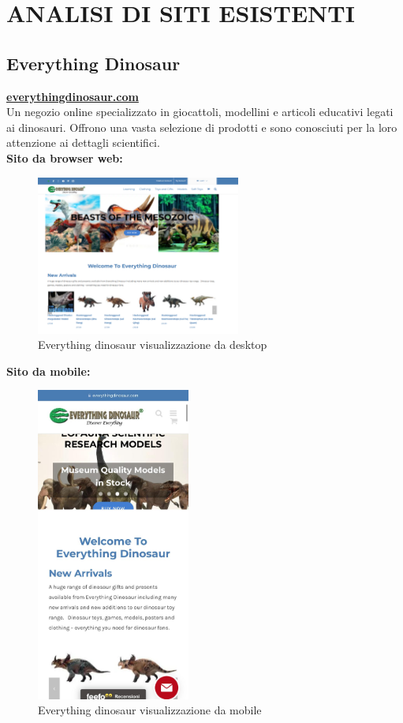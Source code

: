 \section{ANALISI DI SITI ESISTENTI}
\subsection{Everything Dinosaur}
\href{https://www.everythingdinosaur.com/}{\textbf{everythingdinosaur.com}}
\\
Un negozio online specializzato in giocattoli, modellini e articoli educativi legati ai dinosauri. Offrono una vasta selezione di prodotti e sono conosciuti per la loro attenzione ai dettagli scientifici.
\\
\textbf{Sito da browser web:}
\begin{figure}[H]
        \centering
        \includegraphics[width=0.60\textwidth]{immagini/everythingdinosaurpng.png}
        \caption{Everything dinosaur visualizzazione da desktop}
    \end{figure}
    
\textbf{Sito da mobile:}
\begin{figure}[H]
        \centering
        \includegraphics[width=0.45\textwidth]{immagini/everythingdinosaur_mobile.jpg}
        \caption{Everything dinosaur visualizzazione da mobile}
    \end{figure}


